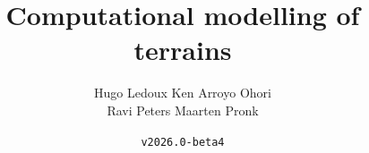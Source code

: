 \documentclass[
  fontsize=10pt, %
  twoside=true, %
  secnumdepth=1, %
  numbers=noenddot, %
]{kaobook}
\begin{document}


\title{Computational modelling of terrains}
\author{Hugo Ledoux \hspace{10mm} Ken Arroyo Ohori\\ Ravi Peters \hspace{17mm} Maarten Pronk}
\date{\texttt{v2026.0-beta4}}



\frontmatter %





\cleardoublepage







\maketitle

\end{document}
